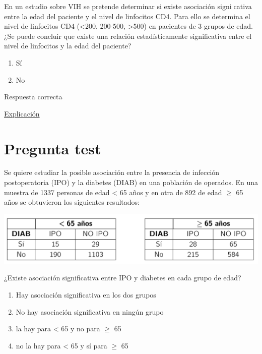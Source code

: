 \documentclass[
]{book}
\providecommand{\tightlist}{%
  \setlength{\itemsep}{0pt}\setlength{\parskip}{0pt}}
\begin{document}
En un estudio sobre VIH se pretende determinar si existe asociación signi􏰂cativa entre la edad del paciente y el nivel de linfocitos CD4. Para ello se determina el nivel de linfocitos CD4 (\textless200, 200-500, \textgreater500) en pacientes de 3 grupos de edad. ¿Se puede concluir que existe una relación estadísticamente significativa entre el nivel de linfocitos y la edad del paciente?

\begin{enumerate}
\def\labelenumi{\alph{enumi})}
\tightlist
\item
  Sí
\item
  No
\end{enumerate}

Respuesta correcta

\href{https://1fjmanzano.github.io/bioestadistica/me\%CC\%81todos-de-inferencia-estadi\%CC\%81stica.html\#prueba-de-la-chi-cuadrado}{Explicación}

\hypertarget{pregunta-test-155}{%
\section{Pregunta test}\label{pregunta-test-155}}

Se quiere estudiar la posible asociación entre la presencia de infección postoperatoria (IPO) y la diabetes (DIAB) en una población de operados. En una muestra de 1337 personas de edad \textless{} 65 años y en otra de 892 de edad \(\geq\) 65 años se obtuvieron los siguientes resultados:

\includegraphics[width=21.06in]{img/5_6}

¿Existe asociación significativa entre IPO y diabetes en cada grupo de edad?

\begin{enumerate}
\def\labelenumi{\alph{enumi})}
\tightlist
\item
  Hay asociación significativa en los dos grupos
\item
  No hay asociación significativa en ningún grupo
\item
  la hay para \textless{} 65 y no para \(\geq\) 65
\item
  no la hay para \textless{} 65 y sí para \(\geq\) 65
\end{enumerate}
\end{document}
